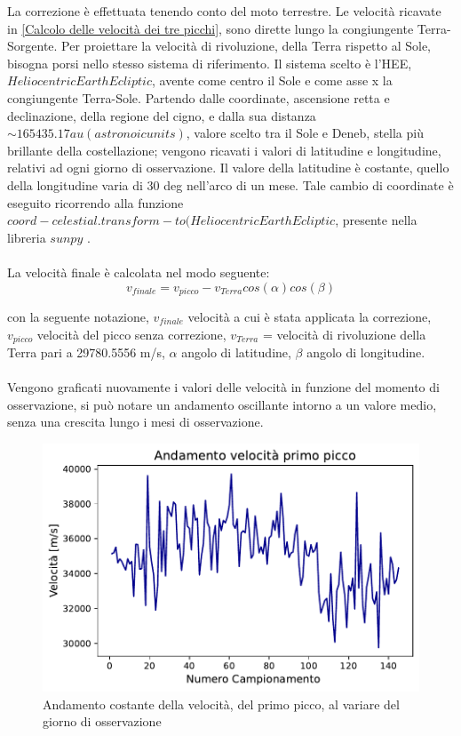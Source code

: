La correzione è effettuata tenendo conto del moto terrestre. Le velocità ricavate in \ref{Calcolo delle velocità dei tre picchi}, sono dirette lungo la congiungente Terra-Sorgente. Per proiettare la velocità di rivoluzione, della Terra rispetto al Sole, bisogna porsi nello stesso sistema di riferimento. Il sistema scelto è l'HEE, $Heliocentric Earth Ecliptic$, avente come centro il Sole e come asse x la congiungente Terra-Sole. Partendo dalle coordinate, ascensione retta e declinazione, della regione del cigno, e dalla sua distanza $\sim 165435.17  au (astronoic units)$, valore scelto tra il Sole e Deneb, stella più brillante della costellazione; vengono ricavati i valori di latitudine e longitudine, relativi ad ogni giorno di osservazione. Il valore della latitudine è costante, quello della longitudine varia di 30 deg nell'arco di un mese. Tale cambio di coordinate è eseguito ricorrendo alla funzione $coord-celestial.transform-to(HeliocentricEarthEcliptic$, presente nella libreria $sunpy$ \cite{Sunpy:sunpy_community2020}.
\\\\
La velocità finale è calcolata nel modo seguente: 
\begin{equation}
	v_{finale}=v_{picco}-v_{Terra}cos(\alpha)cos(\beta)
\end{equation}

con la seguente notazione, $v_{finale} $ velocità a cui è stata applicata la correzione, $v_{picco} $ velocità del picco senza correzione, $v_{Terra}$ = velocità di rivoluzione della Terra pari a 29780.5556 m/s, $\alpha$ angolo di latitudine, $\beta$ angolo di longitudine.
\\\\
Vengono graficati nuovamente i valori delle velocità in funzione del momento di osservazione, si può notare un andamento oscillante intorno a un valore medio, senza una crescita lungo i mesi di osservazione. 

\begin{figure}[H]
	\centering
	\includegraphics[scale=0.8]{Prima_SI.pdf}
	\caption{Andamento costante della velocità, del primo picco, al variare del giorno di osservazione}
    	\label{fig:Prima_NO}
\end{figure}



